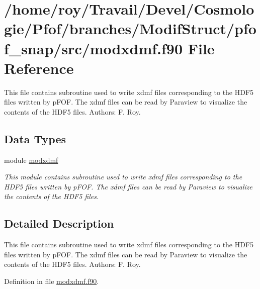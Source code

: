 \hypertarget{pfof__snap_2src_2modxdmf_8f90}{\section{/home/roy/\-Travail/\-Devel/\-Cosmologie/\-Pfof/branches/\-Modif\-Struct/pfof\-\_\-snap/src/modxdmf.f90 File Reference}
\label{pfof__snap_2src_2modxdmf_8f90}
}


This file contains subroutine used to write xdmf files corresponding to the H\-D\-F5 files written by p\-F\-O\-F. The xdmf files can be read by Paraview to visualize the contents of the H\-D\-F5 files. Authors\-: F. Roy.  


\subsection*{Data Types}
\begin{DoxyCompactItemize}
\item 
module \hyperlink{classmodxdmf}{modxdmf}
\begin{DoxyCompactList}\small\item\em This module contains subroutine used to write xdmf files corresponding to the H\-D\-F5 files written by p\-F\-O\-F. The xdmf files can be read by Paraview to visualize the contents of the H\-D\-F5 files. \end{DoxyCompactList}\end{DoxyCompactItemize}


\subsection{Detailed Description}
This file contains subroutine used to write xdmf files corresponding to the H\-D\-F5 files written by p\-F\-O\-F. The xdmf files can be read by Paraview to visualize the contents of the H\-D\-F5 files. Authors\-: F. Roy. 

Definition in file \hyperlink{pfof__snap_2src_2modxdmf_8f90_source}{modxdmf.\-f90}.

